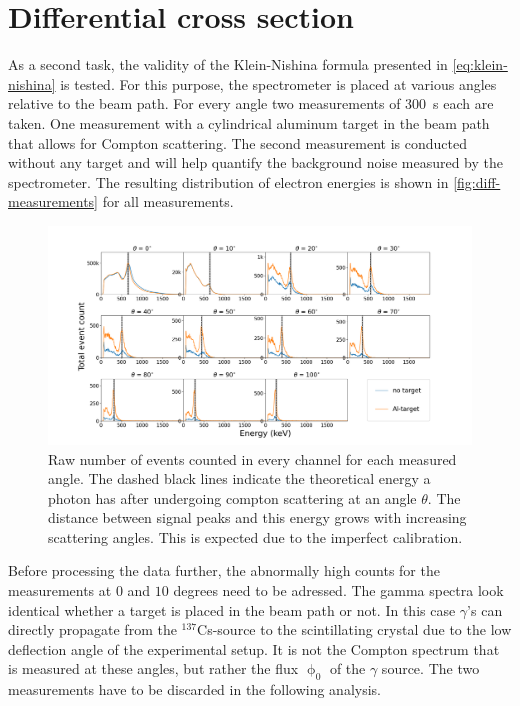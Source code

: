 
\section{Differential cross section}
\label{sec:differential-cross-section}

As a second task, the validity of the Klein-Nishina formula presented in
\autoref{eq:klein-nishina} is tested. For this purpose, the spectrometer is placed
at various angles relative to the beam path. For every angle two measurements of
\SI{300}{\second} each are taken. One measurement with a cylindrical aluminum target
in the beam path that allows for Compton scattering. The second measurement is
conducted without any target and will help quantify the background noise measured
by the spectrometer. The resulting distribution of electron energies is shown in
\autoref{fig:diff-measurements} for all measurements.

\begin{figure}
  \includegraphics[width=1.0\textwidth]{./fig/differential measurements.png}
\caption{Raw number of events counted in every channel for each measured angle.
  The dashed black lines indicate the theoretical energy a photon has after
  undergoing compton scattering at an angle $\theta$. The distance between signal
  peaks and this energy grows with increasing scattering angles. This is expected
  due to the imperfect calibration.}\label{fig:diff-measurements}
\end{figure}

Before processing the data further, the abnormally high counts for the measurements
at $0$ and $10$ degrees need to be adressed. The gamma spectra look identical 
whether a target is placed in the beam path or not. In this case $\gamma$'s can 
directly propagate from the $^{137}$Cs-source to the scintillating crystal due to the
low deflection angle of the experimental setup. It is not the Compton spectrum that 
is measured at these angles, but rather the flux $\upphi_0$ of the $\gamma$ source. 
The two  measurements have to be discarded in the following analysis.

